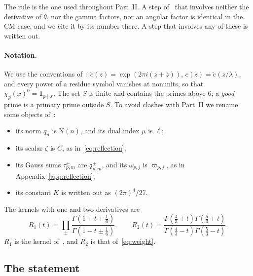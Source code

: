 \documentclass[11pt]{article}
\numberwithin{equation}{section}
\newcommand{\N}{\mathrm N}
\newcommand{\ind}{\mathbf1}
\newcommand{\ce}{\check e}
\begin{document}
The rule is the one used throughout Part~II. A step of~\cite{OAI78} that involves neither the derivative of
$\theta$, nor the gamma factors, nor an angular factor is identical in the CM case, and we cite it by its number
there. A step that involves any of these is written out.

\paragraph{Notation.} We use the conventions of~\cite[Section~5.1]{OAI78}: $\ce(z)=\exp(2\pi i(z+\bar z))$,
$e(z)=\ce(z/\lambda)$, and every power of a residue symbol vanishes at nonunits, so that
$\chi_p(x)^0=\ind_{p\nmid x}$. The set $S$ is finite and contains the primes above $6$; a \emph{good} prime is a
primary prime outside $S$. To avoid clashes with Part~II we rename some objects of~\cite{OAI78}:
\begin{itemize}
\item its norm $q_n$ is $\N(n)$, and its dual index $\mu$ is $\ell$;
\item its scalar $\zeta$ is $C$, as in~\eqref{eq:reflection};
\item its Gauss sums $\tau_{p,m}^\pm$ are $\mathfrak g_{p,m}^\pm$, and its $\omega_{p,j}$ is $\varpi_{p,j}$, as in
 Appendix~\ref{app:reflection};
\item its constant $K$ is written out as $(2\pi)^4/27$.
\end{itemize}
The kernels with one and two derivatives are
\begin{equation}\label{eq:d121}
 R_1(t)=\prod_\pm\frac{\Gamma(1+t\pm\frac16)}{\Gamma(1-t\pm\frac16)},\qquad
 R_2(t)=\frac{\Gamma(\frac43+t)\Gamma(\frac53+t)}{\Gamma(\frac43-t)\Gamma(\frac53-t)}.
\end{equation}
$R_1$ is the kernel of~\cite{OAI78}, and $R_2$ is that of~\eqref{eq:weight}.

\subsection{The statement}
\end{document}
